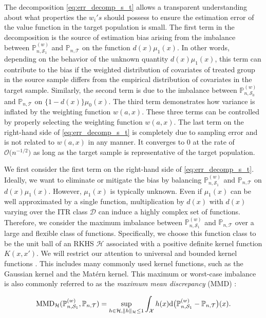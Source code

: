 \documentclass[12pt]{article}
\newcommand{\prob}{\mathbb{P}}
\begin{document}
The decomposition \eqref{eq:err_decomp_s_t} allows a transparent understanding about what properties the $w_i's$ should possess to ensure the estimation error of the value function in the target population is small. The first term in the decomposition is the source of estimation bias arising from the imbalance between $\prob_{n,\mathcal{S}_1}^{(w)}$ and $\prob_{n,\mathcal{T}}$ on the function $d(x)\mu_1(x)$. In other words, depending on the behavior of the unknown quantity $d(x)\mu_1(x)$, this term can contribute to the bias if the weighted distribution of covariates of treated group in the source sample differs from the empirical distribution of covariates in the target sample. Similarly, the second term is due to the imbalance between $\prob_{n,\mathcal{S}_0}^{(w)}$ and $\prob_{n,\mathcal{T}}$ on $\{ 1-d(x) \}\mu_0(x)$. The third term demonstrates how variance is inflated by the weighting function $w(a, x)$. These three terms can be controlled by properly selecting the weighting function $w(a, x)$. The last term on the right-hand side of \eqref{eq:err_decomp_s_t}  is completely due to sampling error and is not related to $w(a,x)$ in any manner. It converges to 0 at the rate of $\mathcal{O}\big(n^{-1/2} \big)$ as long as the target sample is representative of the target population. 

We first consider the first term on the right-hand side of \eqref{eq:err_decomp_s_t}. Ideally, we want to eliminate or mitigate the bias by balancing $\prob_{n,\mathcal{S}_1}^{(w)}$ and $\prob_{n,\mathcal{T}}$ on $d(x)\mu_1(x)$. However, $\mu_1(x)$ is typically unknown. Even if $\mu_1(x)$ can be well approximated by a single function, multiplication by $d(x)$ with $d(x)$ varying over the ITR class $\mathcal{D}$ can induce a highly complex set of functions. Therefore, we consider the maximum imbalance between $\prob_{n,\mathcal{S}_1}^{(w)}$ and $\prob_{n,\mathcal{T}}$ over a large and flexible class of functions. Specifically, we choose this function class to be the unit ball of an RKHS $\mathcal{H}$ associated with a positive definite kernel function $K(x, x')$. We will restrict our attention to universal and bounded kernel functions \citep{simon2018kernel}. This includes many commonly used kernel functions, such as the Gaussian kernel and the Mat\'ern kernel. This maximum or worst-case imbalance is also commonly referred to as the \textit{maximum mean discrepancy} (MMD) \citep{gretton2012kernel}:

\begin{equation}
    \label{eq:mmd_def}
    \textnormal{MMD}_\mathcal{H}(\prob_{n,\mathcal{S}_1}^{(w)}, \prob_{n,\mathcal{T}})
    = 
    \sup_{h \in \mathcal{H}, \| h \|_\mathcal{H} \le 1}
    \int_\mathcal{X} h(x) \textnormal{d} \big( \prob_{n,\mathcal{S}_1}^{(w)} - \prob_{n,\mathcal{T}}\big)(x) 
.\end{equation}
\end{document}
